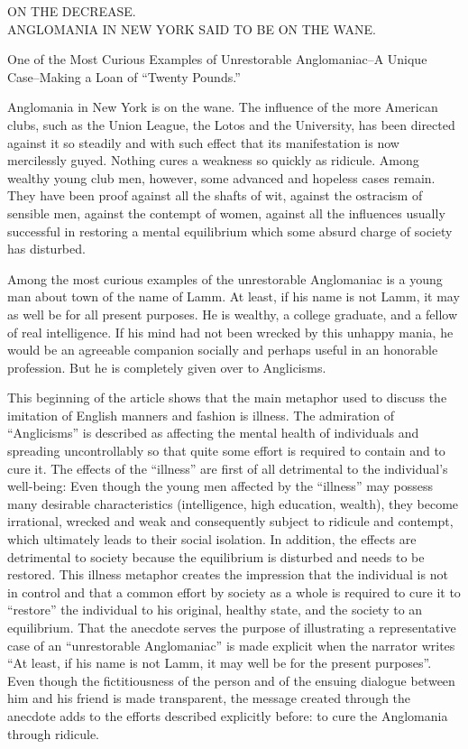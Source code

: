 \begin{ipquote}
\begin{center}
ON THE DECREASE.\\
ANGLOMANIA IN NEW YORK SAID TO BE ON THE WANE.

One of the Most Curious Examples of Unrestorable Anglomaniac–A Unique Case–Making a Loan of “Twenty Pounds.”
\end{center}

Anglomania in New York is on the wane. The influence of the more American clubs, such as the Union League, the Lotos and the University, has been directed against it so steadily and with such effect that its manifestation is now mercilessly guyed. Nothing cures a weakness so quickly as ridicule. Among wealthy young club men, however, some advanced and hopeless cases remain. They have been proof against all the shafts of wit, against the ostracism of sensible men, against the contempt of women, against all the influences usually successful in restoring a mental equilibrium which some absurd charge of society has disturbed.

{Among the most curious examples of the unrestorable Anglomaniac is a young man about town of the name of Lamm. At least, if his name is not Lamm, it may as well be for all present purposes. He is wealthy, a college graduate, and a fellow of real intelligence. If his mind had not been wrecked by this unhappy mania, he would be an agreeable companion socially and perhaps useful in an honorable profession. But he is completely given over to Anglicisms.

\centering {[...]\\}
}
\end{ipquote}


This beginning of the article shows that the main metaphor used to discuss the imitation of English manners and fashion is illness. The admiration of “Anglicisms” is described as affecting the mental health of individuals and spreading uncontrollably so that quite some effort is required to contain and to cure it. The effects of the “illness” are first of all detrimental to the individual’s well-being: Even though the young men affected by the “illness” may possess many desirable characteristics (intelligence, high education, wealth), they become irrational, wrecked and weak and consequently subject to ridicule and contempt, which ultimately leads to their social isolation. In addition, the effects are detrimental to society because the equilibrium is disturbed and needs to be restored. This illness metaphor creates the impression that the individual is not in control and that a common effort by society as a whole is required to cure it to “restore” the individual to his original, healthy state, and the society to an equilibrium. That the anecdote serves the purpose of illustrating a representative case of an “unrestorable Anglomaniac” is made explicit when the narrator writes “At least, if his name is not Lamm, it may well be for the present purposes”. Even though the fictitiousness of the person and of the ensuing dialogue between him and his friend is made transparent, the message created through the anecdote adds to the efforts described explicitly before: to cure the Anglomania through ridicule.


